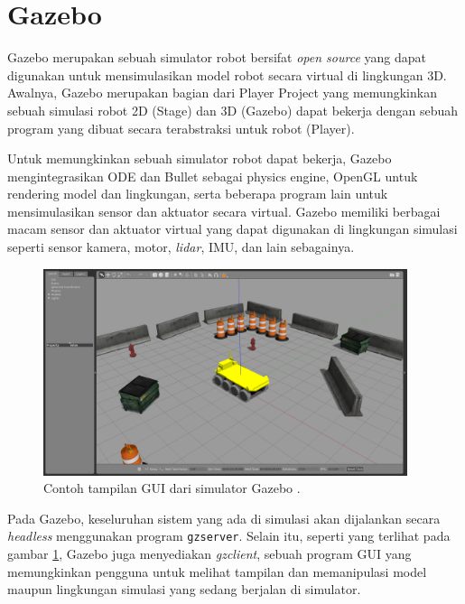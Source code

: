 \section{Gazebo}
\label{sec:gazebo}

Gazebo \citep{cit:koenig2004} merupakan sebuah simulator robot bersifat \emph{open source} yang dapat digunakan untuk mensimulasikan model robot secara virtual di lingkungan 3D.
Awalnya, Gazebo merupakan bagian dari Player Project \citep{cit:gerkey2003} yang memungkinkan sebuah simulasi robot 2D (Stage) dan 3D (Gazebo) dapat bekerja dengan sebuah program yang dibuat secara terabstraksi untuk robot (Player).

Untuk memungkinkan sebuah simulator robot dapat bekerja,
  Gazebo mengintegrasikan ODE dan Bullet sebagai physics engine,
  OpenGL untuk rendering model dan lingkungan,
  serta beberapa program lain untuk mensimulasikan sensor dan aktuator secara virtual.
Gazebo memiliki berbagai macam sensor dan aktuator virtual yang dapat digunakan di lingkungan simulasi seperti sensor kamera, motor, \emph{lidar}, IMU, dan lain sebagainya.

\begin{figure}[ht]
  \centering
  \includegraphics[width=0.95\textwidth,keepaspectratio]{gambar/contoh-gui-gazebo.png}
  \caption{Contoh tampilan GUI dari simulator Gazebo \citep{url:gazeboexample}.}
  \label{fig:contohguigazebo}
\end{figure}

Pada Gazebo, keseluruhan sistem yang ada di simulasi akan dijalankan secara \emph{headless} menggunakan program \lstinline{gzserver}.
Selain itu, seperti yang terlihat pada gambar \ref{fig:contohguigazebo},
  Gazebo juga menyediakan \emph{gzclient}, sebuah program GUI yang memungkinkan pengguna untuk melihat tampilan dan memanipulasi model maupun lingkungan simulasi yang sedang berjalan di simulator.

